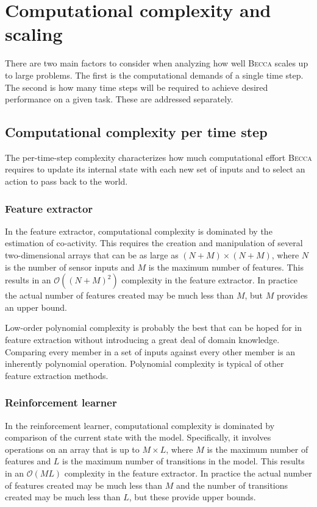 \chapter{Computational complexity and scaling}

There are two main factors to consider when analyzing how well \textsc{Becca} scales up to large problems. The first is the computational demands of a single time step. The second is how many time steps will be required to achieve desired performance on a given task. These are addressed separately.

\section{Computational complexity per time step}

The per-time-step complexity characterizes how much computational effort  \textsc{Becca} requires to update its internal state with each new set of inputs and to select an action to pass back to the world. 

\subsection{Feature extractor}
In the feature extractor, computational complexity is dominated by the estimation of co-activity.  This requires the creation and manipulation of several two-dimensional arrays that can be as large as $(N + M) \times (N + M)$, where $N$ is the number of sensor inputs and $M$ is the maximum number of features. This results in an $\mathcal{O}((N+M)^2)$ complexity in the feature extractor. In practice the actual number of features created may be much less than $M$, but $M$ provides an upper bound.

Low-order polynomial complexity is probably the best that can be hoped for in feature extraction without introducing a great deal of domain knowledge. Comparing every member in a set of inputs against every other member is an inherently polynomial operation. Polynomial complexity is typical of other feature extraction methods. 

\subsection{Reinforcement learner}
In the reinforcement learner, computational complexity is dominated by comparison of the current state with the model. Specifically, it involves operations on an array that is up to $M \times L$, where $M$ is the maximum number of features and $L$ is the maximum number of transitions in the model. This results in an $\mathcal{O}(ML)$ complexity in the feature extractor. In practice the actual number of features created may be much less than $M$ and the number of transitions created may be much less than $L$, but these provide upper bounds.

